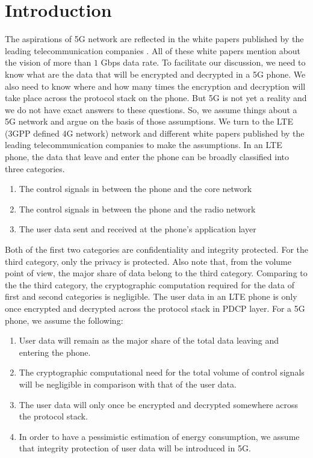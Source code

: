 \documentclass[12pt]{llncs}
\begin{document}
\section{Introduction}
\label{intro} The aspirations of 5G network are reflected in the white papers published by the leading telecommunication companies \cite{Huawei_Vision,5G_Radio_Access-Ericsson,NGMN_5G_White_Paper}. All of these white papers mention about the vision of more than $1$ Gbps data rate. To facilitate our discussion, we need to know what are the data that will be encrypted and decrypted in a 5G phone. We also need to know where and how many times the encryption and decryption will take place across the protocol stack on the phone. But 5G is not yet a reality and we do not have exact answers to these questions. So, we assume things about a 5G network and argue on the basis of those assumptions. We turn to the LTE (3GPP defined 4G network) network and different white papers \cite{5G_Nework_Architecture_Whitepaper,5G_Scenarios_and_Security_Design, Ericsson_white_paper_energy} published by the leading telecommunication companies to make the assumptions. In an LTE phone, the data that leave and enter the phone can be broadly classified into three categories. 
\begin{enumerate}
\item The control signals in between the phone and the core network
\item The control signals in between the phone and the radio network
\item The user data sent and received at the phone's application layer
\end{enumerate}
Both of the first two categories are confidentiality and integrity protected. For the third category, only the privacy is protected. Also note that, from the volume point of view, the major share of data belong to the third category. Comparing to the the third category, the cryptographic computation required for the data of first and second categories is negligible. The user data in an LTE phone is only once encrypted and decrypted across the protocol stack in PDCP layer. For a 5G phone, we assume the following:
\begin{enumerate}
\item User data will remain as the major share of the total data leaving and entering the phone.
\item The cryptographic computational need for the total volume of control signals will be negligible in comparison with that of the user data.
\item The user data will only once be encrypted and decrypted somewhere across the protocol stack.
\item In order to have a pessimistic estimation of energy consumption, we assume that integrity protection of user data will be introduced in 5G.
\end{enumerate}
\end{document}
